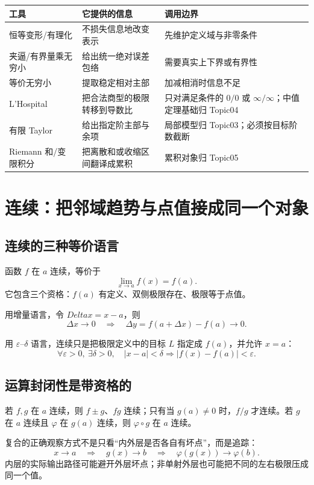 \documentclass[11pt,a4paper]{ctexart}
\begin{document}
\begin{tabularx}{\linewidth}{L{2.5cm}YY}
\toprule
\textbf{工具} & \textbf{它提供的信息} & \textbf{调用边界}\\
\midrule
恒等变形/有理化 & 不损失信息地改变表示 & 先维护定义域与非零条件\\
夹逼/有界量乘无穷小 & 给出统一绝对误差包络 & 需要真实上下界或有界性\\
等价无穷小 & 提取稳定相对主部 & 加减相消时信息不足\\
L'Hospital & 把合法商型的极限转移到导数比 & 只对满足条件的 $0/0$ 或 $\infty/\infty$；中值定理基础归 Topic04\\
有限 Taylor & 给出指定阶主部与余项 & 局部模型归 Topic03；必须按目标阶数截断\\
Riemann 和/变限积分 & 把离散和或收缩区间翻译成累积 & 累积对象归 Topic05\\
\bottomrule
\end{tabularx}

\section{连续：把邻域趋势与点值接成同一个对象}

\subsection{连续的三种等价语言}

函数 $f$ 在 $a$ 连续，等价于
\[
\lim_{x\to a}f(x)=f(a).
\]
它包含三个资格：$f(a)$ 有定义、双侧极限存在、极限等于点值。

用增量语言，令 $Delta x=x-a$，则
\[
\Delta x\to0\quad\Longrightarrow\quad
\Delta y=f(a+\Delta x)-f(a)\to0.
\]

用 $\varepsilon$--$\delta$ 语言，连续只是把极限定义中的目标 $L$ 指定成 $f(a)$，并允许 $x=a$：
\[
\forall\varepsilon>0,\ \exists\delta>0,
\quad |x-a|<\delta\Longrightarrow |f(x)-f(a)|<\varepsilon.
\]

\subsection{运算封闭性是带资格的}

若 $f,g$ 在 $a$ 连续，则 $f\pm g$、$fg$ 连续；只有当 $g(a)\ne0$ 时，$f/g$ 才连续。若 $g$ 在 $a$ 连续且 $\varphi$ 在 $g(a)$ 连续，则 $\varphi\circ g$ 在 $a$ 连续。

复合的正确观察方式不是只看“内外层是否各自有坏点”，而是追踪：
\[
x\to a\quad\Longrightarrow\quad g(x)\to b
\quad\Longrightarrow\quad \varphi(g(x))\to\varphi(b).
\]
内层的实际输出路径可能避开外层坏点；非单射外层也可能把不同的左右极限压成同一个值。
\end{document}
